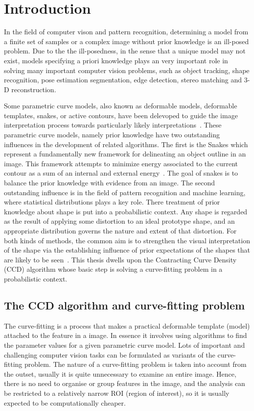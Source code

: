 \chapter{Introduction}
\label{chapter:Introduction}
In the field of computer vison and pattern recognition, determining a
model from a finite set of samples or a complex image without prior
knowledge is an ill-posed problem. Due to the the ill-posedness, in
the sense that a unique model may not exist, models specifying a priori
knowledge plays an very important role in solving many important
computer vision problems, such as object tracking, shape recognition,
pose estimation segmentation, edge detection, stereo matching and 3-D
reconstruction.

Some parametric curve models, also known as deformable models,
deformable templates, snakes, or active contours, have been delevoped
to guide the image interpretation process towards particularly
likely interpretations~\cite{hanek2004fitting}. These parametric curve models, namely
prior knowledge have two outstanding influences in the
development of related algorithms. The first is the Snakes which
represent a fundamentally new framework for delineating an object
outline in an image. This framework attempts to minimize energy
associated to the current contour as a sum of an internal and external
energy~\cite{kass1988snakes}. The goal of snakes is to balance the prior
knowledge with evidence from an image. The second outstanding
influence is in the field of pattern recognition and machine learning,
where statistical distributions plays a key role.  There treatment
of prior knowledge about shape is put into a probabilistic
context. Any shape is regarded as the result of applying some
distortion to an ideal prototype shape, and an appropriate
distribution governs the nature and extent of that distortion.
For both kinds of methods, the common aim is to strengthen the visual
interpretation of the shape via the establishing influence of prior
expectations of the shapes that are likely to be seen~\cite{blake1998active}. This
thesis dwells upon the Contracting Curve Density (CCD) algorithm whose
basic step is solving a curve-fitting problem in a probabilistic
context.


\section{The CCD algorithm and curve-fitting problem}
\label{sec:ccdcfp}
The curve-fitting is a process that makes
a practical deformable template (model) attached to the feature in a
image. In essence it involves using algorithms to find the parameter
values for a given parametric curve model. Lots of important and
challenging computer vision tasks can be formulated as variants of the
curve-fitting problem. The nature of a curve-fitting problem is taken into account from the
outset, usually it is quite unnecessary to examine an entire
image. Hence, there is no need to organise or group features in the
image, and the analysis can be restricted to a relatively narrow
ROI (region of interest), so it is usually expected to be computationally
cheaper.

